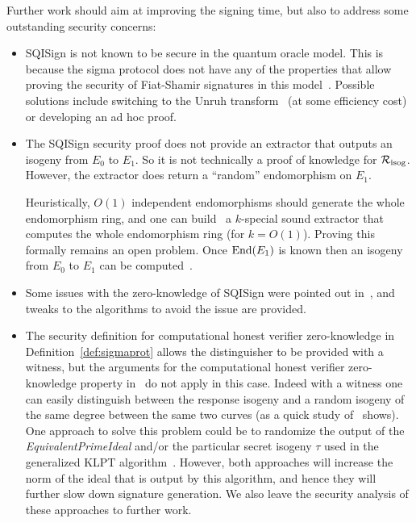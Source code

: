 Further work should aim at improving the signing time, but also to address some outstanding security concerns:
\begin{itemize}
    \item SQISign is not known to be secure in the quantum oracle model. This is because the sigma protocol does not have any of the properties that allow proving the security of Fiat-Shamir signatures in this model~\cite{KLS18}. Possible solutions include switching to the Unruh transform~\cite{Unruh15} (at some efficiency cost) or developing an ad hoc proof.
    \item The SQISign security proof does not provide an extractor that outputs an isogeny from $E_0$ to $E_1$. So it is not technically a proof of knowledge for $\R[isog]$. 
    However, the extractor does return a ``random'' endomorphism on $E_1$.
    
    Heuristically, $O(1)$ independent endomorphisms should generate the whole endomorphism ring, and one can build~\cite{EHLMP20} a $k$-special sound extractor that computes the whole endomorphism ring (for $k=O(1)$). Proving this formally remains an open problem.
    Once $\End(E_1)$ is known then an isogeny from $E_0$ to $E_1$ can be computed~\cite{Wes22}.
    \item Some issues with the zero-knowledge of SQISign were pointed out in~\cite{SQIsign2.0}, and tweaks to the algorithms to avoid the issue are provided.
    \item The security definition for computational honest verifier zero-knowledge in Definition~\ref{def:sigmaprot} allows the distinguisher to be provided with a witness, but the arguments for the computational honest verifier zero-knowledge property in~\cite{DFKLPW20} do not apply in this case. Indeed with a witness one can easily distinguish between the response isogeny and a random isogeny of the same degree between the same two curves (as a quick study of~\cite[Figure 3]{DFKLPW20} shows). One approach to solve this problem could be to randomize the output of the \emph{EquivalentPrimeIdeal} and/or the particular secret isogeny $\tau$ used in the generalized KLPT algorithm~\cite{DFKLPW20}. However, both approaches will increase the norm of the ideal that is output by this algorithm, and hence they will further slow down signature generation. We also leave the security analysis of these approaches to further work.
\end{itemize}






